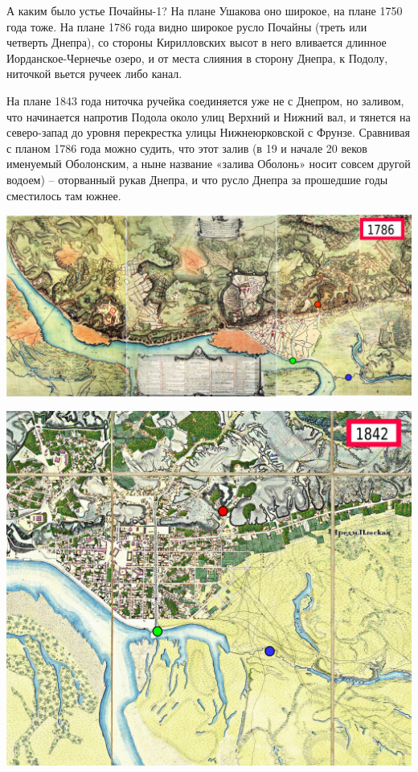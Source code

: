 А каким было устье Почайны-1? На плане Ушакова оно широкое, на плане 1750 года тоже. На плане 1786 года видно широкое русло Почайны (треть или четверть Днепра), со стороны Кирилловских высот в него вливается длинное Иорданское-Чернечье озеро, и от места слияния в сторону Днепра, к Подолу, ниточкой вьется ручеек либо канал.

На плане 1843 года ниточка ручейка соединяется уже не с Днепром, но заливом, что начинается напротив Подола около улиц Верхний и Нижний вал, и тянется на северо-запад до уровня перекрестка улицы Нижнеюрковской с Фрунзе. Сравнивая с планом 1786 года можно судить, что этот залив (в 19 и начале 20 веков именуемый Оболонским, а ныне название «залива Оболонь» носит совсем другой водоем) – оторванный рукав Днепра, и что русло Днепра за прошедшие годы сместилось там южнее.

\newpage

\begin{center}
\includegraphics[width=0.92\linewidth]{chast-colebanie-osnov/pochayna/1786-po.jpg}
\end{center}

\begin{center}
\includegraphics[width=0.92\linewidth]{chast-colebanie-osnov/pochayna/1842-small.jpg}
\end{center}

